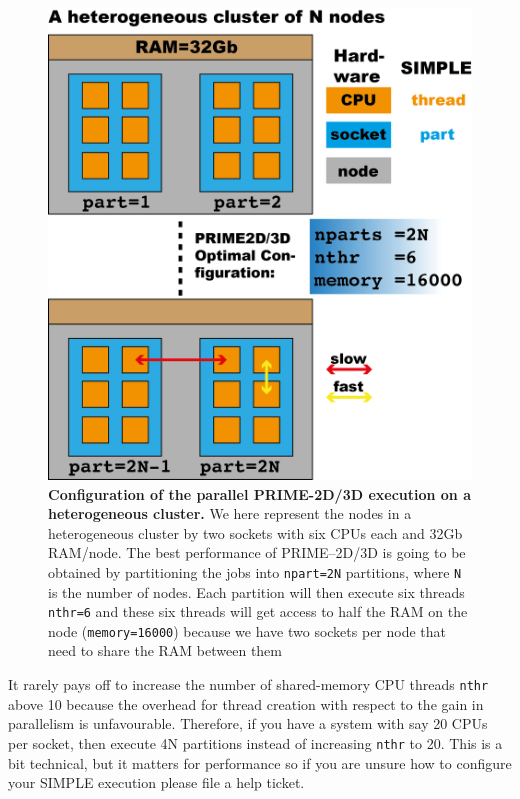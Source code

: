 \documentclass[a4paper,11pt]{article}
\begin{document}
\begin{figure}
\includegraphics[keepaspectratio=true,scale=0.6]{./CPUtopo/cputopo}
\caption{\textbf{Configuration of the parallel PRIME-2D/3D execution on a heterogeneous cluster.} We here represent the nodes in  a heterogeneous cluster by two sockets with six CPUs each and 32Gb RAM/node. The best performance of PRIME--2D/3D is going to be obtained by partitioning  the jobs into \texttt{npart=2N} partitions, where \texttt{N} is the number of nodes. Each partition will then execute six threads \texttt{nthr=6} and these six threads will get access to half the RAM on the node (\texttt{memory=16000}) because we have two sockets per node that need to share the RAM between them}
\end{figure}
It rarely pays off to increase the number of shared-memory CPU threads \texttt{nthr} above 10 because the overhead for thread creation with respect to the gain in parallelism is unfavourable. Therefore, if you have a system with say 20 CPUs per socket, then execute 4N partitions instead of increasing \texttt{nthr} to 20. This is a bit technical, but it matters for performance so if you are unsure how to configure your SIMPLE execution please file a help ticket.
\end{document}
